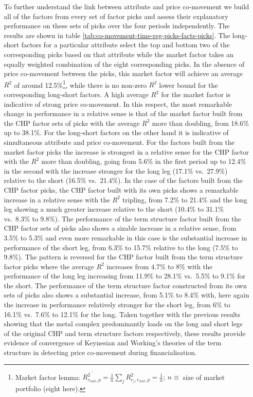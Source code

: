 \documentclass[]{elsarticle} %
\begin{document}
To further understand the link between attribute and price co-movement we build all of the factors from every set of factor picks and assess their explanatory performance on these sets of picks over the four periods independently. The results are shown in table \ref{tab:co-movement-time-reg-picks-facts-picks}. The long-short factors for a particular attribute select the top and bottom two of the corresponding picks based on that attribute while the market factor takes an equally weighted combination of the eight corresponding picks. In the absence of price co-movement between the picks, this market factor will achieve an average \(R^{2}\) of around 12.5\%\footnote{Market factor lemma: \(\overline{R_{r_{mkt}, p}^{2}} = \frac{1}{n} \sum_{j} R_{r_{j}, r_{mkt}, p}^{2} = \frac{1}{n}; \: n\equiv\) size of market portfolio (eight here).}, while there is no non-zero \(R^{2}\) lower bound for the corresponding long-short factors. A high average \(R^{2}\) for the market factor is indicative of strong price co-movement. In this respect, the most remarkable change in performance in a relative sense is that of the market factor built from the CHP factor sets of picks with the average \(R^{2}\) more than doubling, from 18.6\% up to 38.1\%. For the long-short factors on the other hand it is indicative of simultaneous attribute and price co-movement. For the factors built from the market factor picks the increase is strongest in a relative sense for the CHP factor with the \(R^{2}\) more than doubling, going from 5.6\% in the first period up to 12.4\% in the second with the increase stronger for the long leg (17.1\% vs.~27.9\%) relative to the short (16.5\% vs.~21.4\%). In the case of the factors built from the CHP factor picks, the CHP factor built with its own picks shows a remarkable increase in a relative sense with the \(R^{2}\) tripling, from 7.2\% to 21.4\% and the long leg showing a much greater increase relative to the short (10.4\% to 31.1\% vs.~8.3\% to 9.8\%). The performance of the term structure factor built from the CHP factor sets of picks also shows a sizable increase in a relative sense, from 3.5\% to 5.3\% and even more remarkable in this case is the substantial increase in performance of the short leg, from 6.3\% to 15.7\% relative to the long (7.5\% to 9.8\%). The pattern is reversed for the CHP factor built from the term structure factor picks where the average \(R^{2}\) increases from 4.7\% to 8\% with the performance of the long leg increasing from 11.9\% to 28.1\% vs.~5.5\% to 9.1\% for the short. The performance of the term structure factor constructed from its own sets of picks also shows a substantial increase, from 5.1\% to 8.4\% with, here again the increase in performance relatively stronger for the short leg, from 6\% to 16.1\% vs.~7.6\% to 12.1\% for the long. Taken together with the previous results showing that the metal complex predominantly loads on the long and short legs of the original CHP and term structure factors respectively, these results provide evidence of convergence of Keynesian and Working's theories of the term structure in detecting price co-movement during financialisation.
\end{document}
